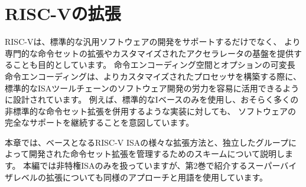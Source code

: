\begin{comment}
\chapter{Extending RISC-V}
\end{comment}
\chapter{RISC-Vの拡張}
\label{extensions}

\begin{comment}
In addition to supporting standard general-purpose software
development, another goal of RISC-V is to provide a basis for more
specialized instruction-set extensions or more customized
accelerators.  The instruction encoding spaces and optional
variable-length instruction encoding are designed to make it easier to
leverage software development effort for the standard ISA toolchain
when building more customized processors.  For example, the intent is
to continue to provide full software support for implementations that
only use the standard I base, perhaps together with many non-standard
instruction-set extensions.
\end{comment}
RISC-Vは、標準的な汎用ソフトウェアの開発をサポートするだけでなく、
より専門的な命令セットの拡張やカスタマイズされたアクセラレータの基盤を提供することも目的としています。
命令エンコーディング空間とオプションの可変長命令エンコーディングは、よりカスタマイズされたプロセッサを構築する際に、
標準的なISAツールチェーンのソフトウェア開発の労力を容易に活用できるように設計されています。
例えば、標準的なIベースのみを使用し、おそらく多くの非標準的な命令セット拡張を併用するような実装に対しても、
ソフトウェアの完全なサポートを継続することを意図しています。

\begin{comment}
This chapter describes various ways in which the base RISC-V ISA can
be extended, together with the scheme for managing instruction-set
extensions developed by independent groups.  This volume only deals
with the unprivileged ISA, although the same approach and terminology is
used for supervisor-level extensions described in the second volume.
\end{comment}
本章では、ベースとなるRISC-V ISAの様々な拡張方法と、独立したグループによって開発された命令セット拡張を管理するためのスキームについて説明します。
本編では非特権ISAのみを扱っていますが、第2巻で紹介するスーパーバイザレベルの拡張についても同様のアプローチと用語を使用しています。

